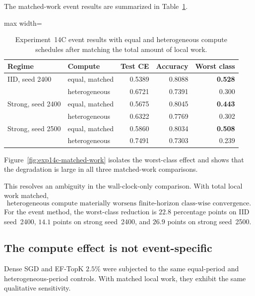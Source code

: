 The matched-work event results are summarized in Table~\ref{tab:exp14c-matched-work}.
\begin{table}[ht]
\centering
\small
\caption{Experiment~14C event results with equal and heterogeneous compute schedules after matching the total amount of local work.}
\label{tab:exp14c-matched-work}
\begin{adjustbox}{max width=\textwidth}
\begin{tabular}{llrrr}
\toprule
Regime & Compute & Test CE & Accuracy & Worst class\\
\midrule
IID, seed 2400 & equal, matched & 0.5389 & 0.8088 & \textbf{0.528}\\
                 & heterogeneous & 0.6721 & 0.7391 & 0.300\\
Strong, seed 2400 & equal, matched & 0.5675 & 0.8045 & \textbf{0.443}\\
                    & heterogeneous & 0.6322 & 0.7769 & 0.302\\
Strong, seed 2500 & equal, matched & 0.5860 & 0.8034 & \textbf{0.508}\\
                    & heterogeneous & 0.7491 & 0.7303 & 0.239\\
\bottomrule
\end{tabular}
\end{adjustbox}
\end{table}

Figure~\ref{fig:exp14c-matched-work} isolates the worst-class effect and shows that the degradation is large in all three matched-work comparisons.

\ExpFourteenCMatchedWorkFigure

This resolves an ambiguity in the wall-clock-only comparison. With total local work matched,
\begin{equation}
\boxed{\text{heterogeneous compute materially worsens finite-horizon class-wise convergence.}}
\end{equation}
For the event method, the worst-class reduction is $22.8$ percentage points on IID seed~2400, $14.1$ points on strong seed~2400, and $26.9$ points on strong seed~2500.

\subsection{The compute effect is not event-specific}

Dense SGD and EF-TopK $2.5\%$ were subjected to the same equal-period and heterogeneous-period controls. With matched local work, they exhibit the same qualitative sensitivity.

